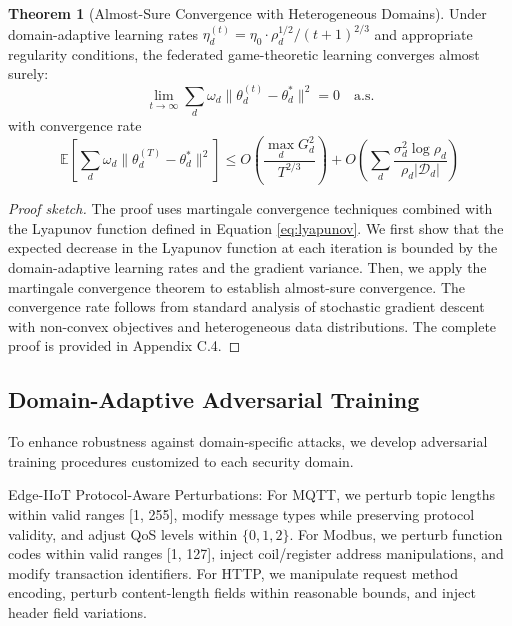 \documentclass[12pt,a4paper]{article}
\theoremstyle{definition}
\newtheorem{theorem}{Theorem}[section]
\newcommand{\E}{\mathbb{E}}
\newcommand{\D}{\mathcal{D}}
\begin{document}
\begin{theorem}[Almost-Sure Convergence with Heterogeneous Domains]
\label{thm:convergence}
Under domain-adaptive learning rates $\eta_d^{(t)} = \eta_0 \cdot \rho_d^{1/2} / (t+1)^{2/3}$ and appropriate regularity conditions, the federated game-theoretic learning converges almost surely: 
\begin{equation}
\lim_{t \to \infty} \sum_d \omega_d \|\theta_d^{(t)} - \theta_d^*\|^2 = 0 \quad \text{a.s.}
\end{equation}
with convergence rate 
\begin{equation}
\E\left[\sum_d \omega_d \|\theta_d^{(T)} - \theta_d^*\|^2\right] \leq O\left(\frac{\max_d G_d^2}{T^{2/3}}\right) + O\left(\sum_d \frac{\sigma_d^2 \log \rho_d}{\rho_d |\D_d|}\right)
\end{equation}
\end{theorem}

\begin{proof}[Proof sketch]
The proof uses martingale convergence techniques combined with the Lyapunov function defined in Equation \eqref{eq:lyapunov}. We first show that the expected decrease in the Lyapunov function at each iteration is bounded by the domain-adaptive learning rates and the gradient variance. Then, we apply the martingale convergence theorem to establish almost-sure convergence. The convergence rate follows from standard analysis of stochastic gradient descent with non-convex objectives and heterogeneous data distributions. The complete proof is provided in Appendix C.4.
\end{proof}

\subsection{Domain-Adaptive Adversarial Training}

To enhance robustness against domain-specific attacks, we develop adversarial training procedures customized to each security domain.

Edge-IIoT Protocol-Aware Perturbations: For MQTT, we perturb topic lengths within valid ranges [1, 255], modify message types while preserving protocol validity, and adjust QoS levels within $\{0, 1, 2\}$. For Modbus, we perturb function codes within valid ranges [1, 127], inject coil/register address manipulations, and modify transaction identifiers. For HTTP, we manipulate request method encoding, perturb content-length fields within reasonable bounds, and inject header field variations.
\end{document}
